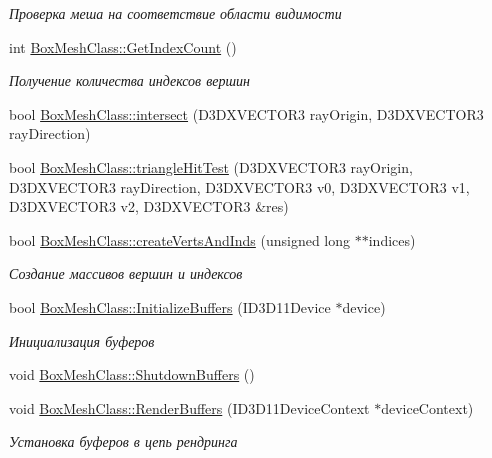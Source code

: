 \begin{DoxyCompactItemize}
\begin{DoxyCompactList}\small\item\em Проверка меша на соответствие области видимости \end{DoxyCompactList}\item 
int \hyperlink{group___meshes_gac93e95f835fa462244dd9cd1af22de52}{Box\+Mesh\+Class\+::\+Get\+Index\+Count} ()
\begin{DoxyCompactList}\small\item\em Получение количества индексов вершин \end{DoxyCompactList}\item 
bool \hyperlink{group___meshes_gae7ba5327d6a50c4e52bda354b77c1172}{Box\+Mesh\+Class\+::intersect} (D3\+D\+X\+V\+E\+C\+T\+O\+R3 ray\+Origin, D3\+D\+X\+V\+E\+C\+T\+O\+R3 ray\+Direction)
\item 
bool \hyperlink{group___meshes_gaa5a24747a666b2c1b670bce1caa25941}{Box\+Mesh\+Class\+::triangle\+Hit\+Test} (D3\+D\+X\+V\+E\+C\+T\+O\+R3 ray\+Origin, D3\+D\+X\+V\+E\+C\+T\+O\+R3 ray\+Direction, D3\+D\+X\+V\+E\+C\+T\+O\+R3 v0, D3\+D\+X\+V\+E\+C\+T\+O\+R3 v1, D3\+D\+X\+V\+E\+C\+T\+O\+R3 v2, D3\+D\+X\+V\+E\+C\+T\+O\+R3 \&res)
\item 
bool \hyperlink{group___meshes_ga62e6e1fe0ba4861809bda70f16928c87}{Box\+Mesh\+Class\+::create\+Verts\+And\+Inds} (unsigned long $\ast$$\ast$indices)
\begin{DoxyCompactList}\small\item\em Создание массивов вершин и индексов \end{DoxyCompactList}\item 
bool \hyperlink{group___meshes_gab1b81243c18f1df89eacef16b0c552a0}{Box\+Mesh\+Class\+::\+Initialize\+Buffers} (I\+D3\+D11\+Device $\ast$device)
\begin{DoxyCompactList}\small\item\em Инициализация буферов \end{DoxyCompactList}\item 
void \hyperlink{group___meshes_gafb9e4d45043b88c956141fc2e1257dd5}{Box\+Mesh\+Class\+::\+Shutdown\+Buffers} ()
\item 
void \hyperlink{group___meshes_gac70d8b4689d1666f547585fc60c8a21c}{Box\+Mesh\+Class\+::\+Render\+Buffers} (I\+D3\+D11\+Device\+Context $\ast$device\+Context)
\begin{DoxyCompactList}\small\item\em Установка буферов в цепь рендринга \end{DoxyCompactList}\end{DoxyCompactItemize}
